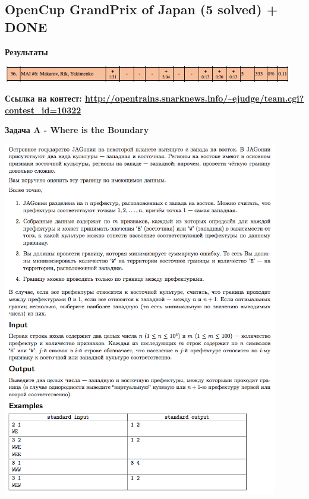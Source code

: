 \documentclass[a4paper,12pt]{article}
\begin{document}
%
%
\newpage
\subsection{OpenCup GrandPrix of Japan (5 solved) + DONE}

\textbf{{\large Результаты}} \\
\begin{center}
\includegraphics[width=0.95\textwidth]{OC_Japan/result.png}\\ [1cm]
\end{center}

\textbf{{\large Ссылка на контест: \url{http://opentrains.snarknews.info/~ejudge/team.cgi?contest_id=10322}}}


\newpage
\textbf{{\large Задача A - Where is the Boundary}} \\

\begin{center}
\includegraphics[width=0.9\textwidth]{OC_Japan/A.png}\\ [1cm]
\end{center}
\end{document}

